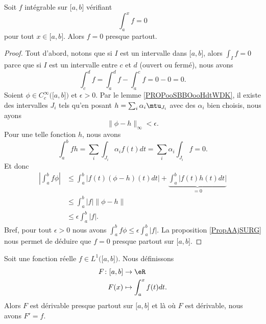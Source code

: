 \begin{proposition}	\label{PROPooZOJHooKwZOFW}
	Soit \( f\) intégrable sur \( \mathopen[ a,b\mathclose]\) vérifiant
	\begin{equation}
		\int_a^xf=0
	\end{equation}
	pour tout \( x\in\mathopen[ a,b\mathclose]\). Alors \( f=0\) presque partout.
\end{proposition}

\begin{proof}
	Tout d'abord, notons que si \( I\) est un intervalle dans \( \mathopen[ a,b\mathclose]\), alors \( \int_If=0\) parce que si \( I\) est un intervalle entre \( c\) et \( d\) (ouvert ou fermé), nous avons
	\begin{equation}
		\int_{c}^df=\int_a^df-\int_a^cf=0-0=0.
	\end{equation}
	Soient \( \phi\in C^{\infty}_c\big( \mathopen[ a,b\mathclose] \big)\) et \( \epsilon>0\). Par le lemme \ref{PROPooSBBOooHdtWDK}, il existe des intervalles \( J_i\) tels qu'en posant \( h=\sum_i\alpha_i\mtu_{J_i}\) avec des \( \alpha_i\) bien choisis, nous ayons
	\begin{equation}
		\| \phi-h \|_{\infty}<\epsilon.
	\end{equation}
	Pour une telle fonction \( h\), nous avons
	\begin{equation}
		\int_a^bfh=\sum_i\int_{J_i}\alpha_if(t)dt=\sum_i\alpha_i\int_{J_i}f=0.
	\end{equation}
	Et donc
	\begin{subequations}
		\begin{align}
			| \int_a^bf\phi | & \leq \int_a^b| f(t)(\phi-h)(t)dt |+\underbrace{\int_a^b| f(t)h(t)dt |}_{=0} \\
			                  & \leq\int_a^b|f|\| \phi-h \|                                                 \\
			                  & \leq \epsilon\int_a^b|f|.
		\end{align}
	\end{subequations}
	Bref, pour tout \( \epsilon>0\) nous avons \( \int_a^bf\phi\leq \epsilon\int_a^b| f |\). La proposition \ref{PropAAjSURG} nous permet de déduire que \( f=0\) presque partout sur \( \mathopen[ a,b\mathclose]\).
\end{proof}



\begin{proposition}	\label{PROPooUMIPooQGXaPd}
	Soit une fonction réelle \(  f\in L^1\big( \mathopen[ a,b\mathclose]\big)\). Nous définissons
	\begin{equation}
		\begin{aligned}
			F\colon \mathopen[ a,b\mathclose] & \to \eR                 \\
			F(x)                              & \mapsto \int_a^xf(t)dt.
		\end{aligned}
	\end{equation}
	Alors \( F\) est dérivable presque partout sur \( \mathopen[ a,b\mathclose]\) et là où \( F\) est dérivable, nous avons \( F'=f\).
\end{proposition}

